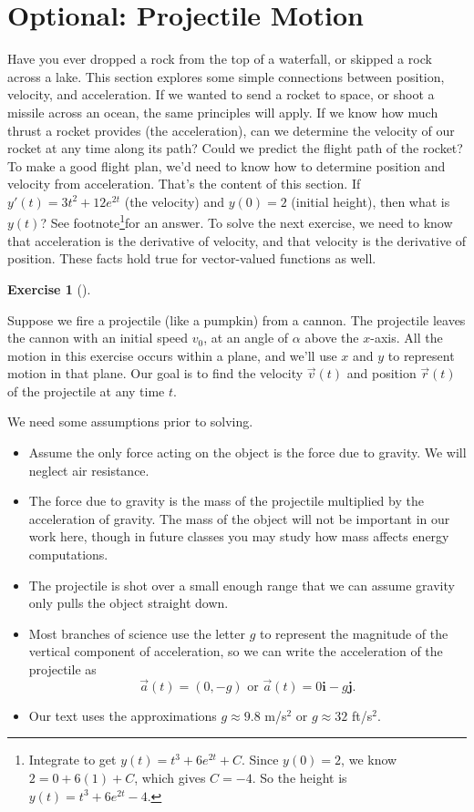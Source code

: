 \documentclass[10pt,]{book}
\theoremstyle{plain}
\theoremstyle{definition}
\theoremstyle{definition}
\theoremstyle{definition}
\theoremstyle{definition}
\newtheorem{exploration}[project]{Exercise}
\theoremstyle{definition}
\numberwithin{equation}{section}
\begin{document}
\section[{Optional: Projectile Motion}]{Optional: Projectile Motion}\label{section-24}
Have you ever dropped a rock from the top of a waterfall, or skipped a rock across a lake. This section explores some simple connections between position, velocity, and acceleration. If we wanted to send a rocket to space, or shoot a missile across an ocean, the same principles will apply. If we know how much thrust a rocket provides (the acceleration), can we determine the velocity of our rocket at any time along its path? Could we predict the flight path of the rocket? To make a good flight plan, we'd need to know how to determine position and velocity from acceleration. That's the content of this section.%
If \(y'(t) = 3t^2+12e^{2t}\) (the velocity) and \(y(0)=2\) (initial height), then what is \(y(t)\)? See footnote\footnote{Integrate to get \(y(t) = t^3+6e^{2t}+C\). Since \(y(0)=2\), we know \(2=0+6(1)+C\), which gives \(C=-4\). So the height is \(y(t) = t^3+6e^{2t}-4\).\label{fn-6}}for an answer.%
To solve the next exercise, we need to know that acceleration is the derivative of velocity, and that velocity is the derivative of position. These facts hold true for vector-valued functions as well.%
\begin{exploration}[]\label{exploration-159}
\end{exploration}
Suppose we fire a projectile (like a pumpkin) from a cannon. The projectile leaves the cannon with an initial speed \(v_0\), at an angle of \(\alpha\) above the \(x\)-axis. All the motion in this exercise occurs within a plane, and we'll use \(x\) and \(y\) to represent motion in that plane. Our goal is to find the velocity \(\vec v(t)\) and position \(\vec r(t)\) of the projectile at any time \(t\).%
\par
We need some assumptions prior to solving. \leavevmode%
\begin{itemize}[label=\textbullet]
\item{}Assume the only force acting on the object is the force due to gravity. We will neglect air resistance.%
\item{}The force due to gravity is the mass of the projectile multiplied by the acceleration of gravity. The mass of the object will not be important in our work here, though in future classes you may study how mass affects energy computations.%
\item{}The projectile is shot over a small enough range that we can assume gravity only pulls the object straight down.%
\item{}Most branches of science use the letter \(g\) to represent the magnitude of the vertical component of acceleration, so we can write the acceleration of the projectile as%
\begin{equation*}
\vec a(t) = (0,-g)   \text{ or }   \vec a(t)= 0\textbf{i}-g\textbf{j}.
\end{equation*}
%
\item{}Our text uses the approximations \(g\approx 9.8\) m/s\(^2\) or \(g\approx32\) ft/s\(^2\).%
\end{itemize}
\end{document}

